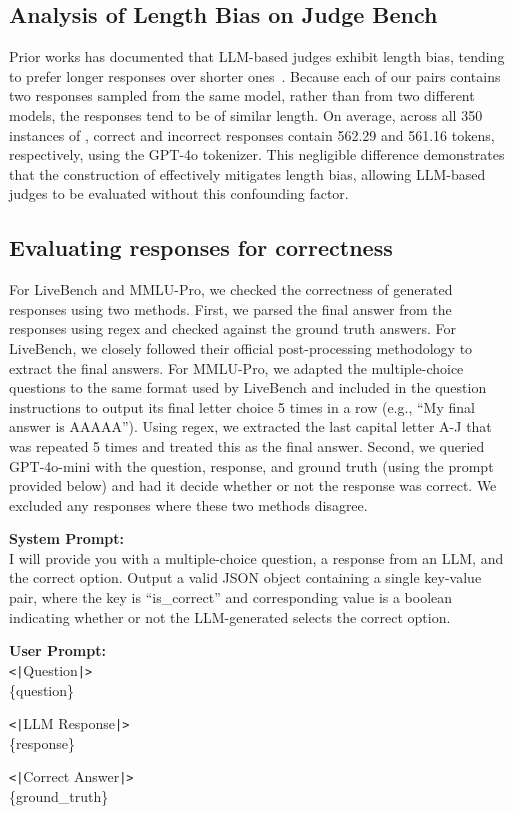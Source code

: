 \documentclass{article} %
\begin{document}
\subsection{Analysis of Length Bias on Judge Bench}
Prior works has documented that LLM-based judges exhibit length bias, tending to prefer longer responses over shorter ones~\citep{hu2024explaininglengthbiasllmbased, wei2024systematicevaluationllmasajudgellm}. Because each of our pairs contains two responses sampled from the same model, rather than from two different models, the responses tend to be of similar length. On average, across all 350 instances of \sys, correct and incorrect responses contain 562.29 and 561.16 tokens, respectively, using the GPT-4o tokenizer. This negligible difference demonstrates that the construction of \sys effectively mitigates length bias, allowing LLM-based judges to be evaluated without this confounding factor.

\subsection{Evaluating responses for correctness}
\label{appendix:solution-checkers}
For LiveBench and MMLU-Pro, we checked the correctness of generated responses using two methods. First, we parsed the final answer from the responses using regex and checked against the ground truth answers. For LiveBench, we closely followed their official post-processing methodology to extract the final answers. For MMLU-Pro, we adapted the multiple-choice questions to the same format used by LiveBench and included in the question instructions to output its final letter choice 5 times in a row (e.g., ``My final answer is AAAAA''). Using regex, we extracted the last capital letter A-J that was repeated 5 times and treated this as the final answer. Second, we queried GPT-4o-mini with the question, response, and ground truth (using the prompt provided below) and had it decide whether or not the response was correct. We excluded any responses where these two methods disagree.

\begin{tcolorbox}[colback=gray!5!white, colframe=gray!60!black, title=Prompt template for checking correctness with GPT-4o-mini., breakable]
\textbf{System Prompt:}\\
I will provide you with a multiple-choice question, a response from an LLM, and the correct option. Output a valid JSON object containing a single key-value pair, where the key is ``is\_correct'' and corresponding value is a boolean indicating whether or not the LLM-generated selects the correct option.\\\par
\textbf{User Prompt:}\\
\texttt{<|}Question\texttt{|>}\\
\{question\}\\\par
\texttt{<|}LLM Response\texttt{|>}\\
\{response\}\\\par
\texttt{<|}Correct Answer\texttt{|>}\\
\{ground\_truth\}
\end{tcolorbox}
\end{document}
